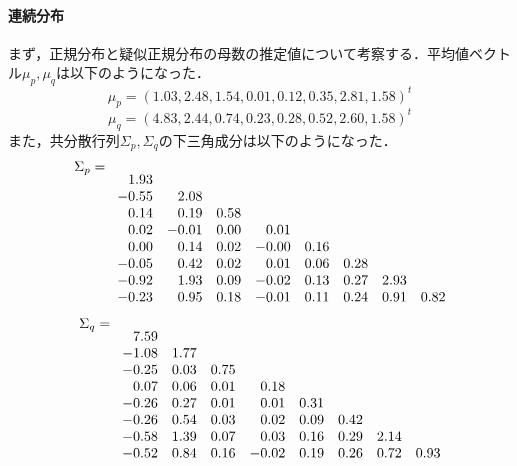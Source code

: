 \paragraph{連続分布}
まず，正規分布と疑似正規分布の母数の推定値について考察する．平均値ベクトル$\mu_{p},\mu_{q}$は以下のようになった．
\begin{equation}
  \mu_{p} = ( 1.03, 2.48, 1.54, 0.01, 0.12, 0.35, 2.81, 1.58)^{t}
\end{equation}
\begin{equation}
  \mu_{q} = ( 4.83, 2.44, 0.74, 0.23, 0.28, 0.52, 2.60, 1.58)^{t}
\end{equation}
また，共分散行列$\Sigma_{p}, \Sigma_{q}$の下三角成分は以下のようになった．
\begin{equation}
\def\arraystretch{}
\begin{array}{rrrrrrrr}
\Sigma_{p} = \hspace*{12mm} \\[-1mm]
   1.93 \\
  -0.55 &  2.08 \\
   0.14 &  0.19 &  0.58 \\
   0.02 & -0.01 &  0.00 &  0.01 \\
   0.00 &  0.14 &  0.02 & -0.00 &  0.16 \\
  -0.05 &  0.42 &  0.02 &  0.01 &  0.06 &  0.28 \\
  -0.92 &  1.93 &  0.09 & -0.02 &  0.13 &  0.27 &  2.93 \\
  -0.23 &  0.95 &  0.18 & -0.01 &  0.11 &  0.24 &  0.91 &  0.82
\end{array}
\end{equation}
\begin{equation}
\def\arraystretch{}
\begin{array}{rrrrrrrr}
\Sigma_{q} = \hspace*{12mm} \\[-1mm]
     7.59 \\
  -1.08 &  1.77 \\
  -0.25 &  0.03 &  0.75 \\
   0.07 &  0.06 &  0.01 &  0.18 \\
  -0.26 &  0.27 &  0.01 &  0.01 &  0.31 \\
  -0.26 &  0.54 &  0.03 &  0.02 &  0.09 &  0.42 \\
  -0.58 &  1.39 &  0.07 &  0.03 &  0.16 &  0.29 &  2.14 \\
  -0.52 &  0.84 &  0.16 & -0.02 &  0.19 &  0.26 &  0.72 &  0.93
\end{array}
\end{equation}
